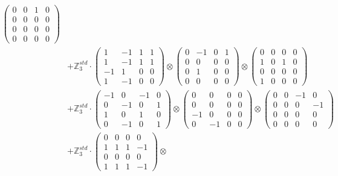 \documentclass{article}
\begin{document}
{\begin{align}
            \begin{pmatrix} 0 & 0 & 1 & 0 \\ 0 & 0 & 0 & 0 \\ 0 & 0 & 0 & 0 \\ 0 & 0 & 0 & 0 \end{pmatrix} \\ 
        &+ \label{Rs16-Rc11-Solution-32-c25} \mathbb{Z}_3^{std} \cdot 
            \begin{pmatrix} 1 & -1 & 1 & 1 \\ 1 & -1 & 1 & 1 \\ -1 & 1 & 0 & 0 \\ 1 & -1 & 0 & 0 \end{pmatrix} \otimes 
            \begin{pmatrix} 0 & -1 & 0 & 1 \\ 0 & 0 & 0 & 0 \\ 0 & 1 & 0 & 0 \\ 0 & 0 & 0 & 0 \end{pmatrix} \otimes 
            \begin{pmatrix} 0 & 0 & 0 & 0 \\ 1 & 0 & 1 & 0 \\ 0 & 0 & 0 & 0 \\ 1 & 0 & 0 & 0 \end{pmatrix} \\ 
        &+ \label{Rs16-Rc11-Solution-32-c26} \mathbb{Z}_3^{std} \cdot 
            \begin{pmatrix} -1 & 0 & -1 & 0 \\ 0 & -1 & 0 & 1 \\ 1 & 0 & 1 & 0 \\ 0 & -1 & 0 & 1 \end{pmatrix} \otimes 
            \begin{pmatrix} 0 & 0 & 0 & 0 \\ 0 & 0 & 0 & 0 \\ -1 & 0 & 0 & 0 \\ 0 & -1 & 0 & 0 \end{pmatrix} \otimes 
            \begin{pmatrix} 0 & 0 & -1 & 0 \\ 0 & 0 & 0 & -1 \\ 0 & 0 & 0 & 0 \\ 0 & 0 & 0 & 0 \end{pmatrix} \\ 
        &+ \label{Rs16-Rc11-Solution-32-c27} \mathbb{Z}_3^{std} \cdot 
            \begin{pmatrix} 0 & 0 & 0 & 0 \\ 1 & 1 & 1 & -1 \\ 0 & 0 & 0 & 0 \\ 1 & 1 & 1 & -1 \end{pmatrix} \otimes 

\end{align}}
\end{document}
